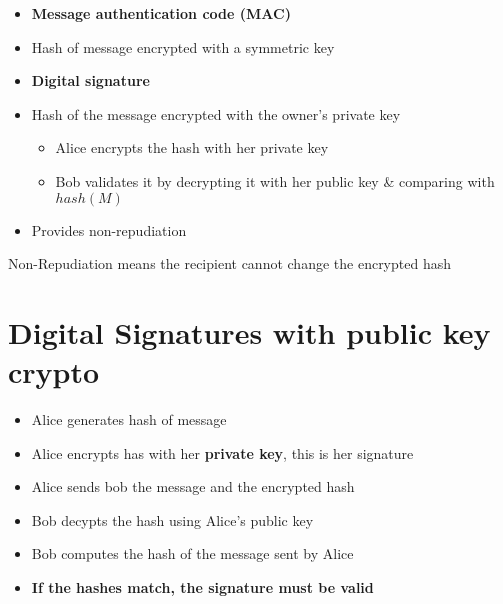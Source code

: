 \documentclass{easyclass}
\begin{document}
    \begin{prf}{}
        \begin{minipage}[t]{0.45\linewidth}
            \centering
            \begin{itemize}
                \item \textbf{Message authentication code (MAC)}
                \item Hash of message encrypted with a symmetric key
            \end{itemize}
            \end{minipage}
            \hspace{0.5cm}
            \begin{minipage}[t]{0.45\linewidth}
                \begin{itemize}
                    \item \textbf{Digital signature}
                    \item Hash of the message encrypted with the owner's private key
                    \begin{itemize}
                        \item Alice encrypts the hash with her private key
                        \item Bob validates it by decrypting it with her public key \& comparing
                        with $hash(M)$
                    \end{itemize}
                    \item Provides non-repudiation
                \end{itemize}
            \centering
        \end{minipage}
        \begin{definition}{}
            Non-Repudiation means the recipient cannot change the encrypted hash
        \end{definition}
    \end{prf}

    \section{Digital Signatures with public key crypto}

    \begin{itemize}
        \item Alice generates hash of message
        \item Alice encrypts has with her \textbf{private key}, this is her signature
        \item Alice sends bob the message and the encrypted hash
        \item Bob decypts the hash using Alice's public key
        \item Bob computes the hash of the message sent by Alice
        \item \textbf{If the hashes match, the signature must be valid}
    \end{itemize}
\end{document}

